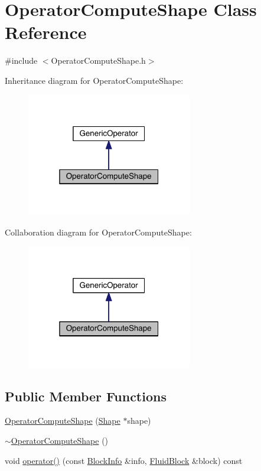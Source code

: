 \hypertarget{class_operator_compute_shape}{}\section{Operator\+Compute\+Shape Class Reference}
\label{class_operator_compute_shape}


{\ttfamily \#include $<$Operator\+Compute\+Shape.\+h$>$}



Inheritance diagram for Operator\+Compute\+Shape\+:\nopagebreak
\begin{figure}[H]
\begin{center}
\leavevmode
\includegraphics[width=205pt]{de/d44/class_operator_compute_shape__inherit__graph}
\end{center}
\end{figure}


Collaboration diagram for Operator\+Compute\+Shape\+:\nopagebreak
\begin{figure}[H]
\begin{center}
\leavevmode
\includegraphics[width=205pt]{d6/d6a/class_operator_compute_shape__coll__graph}
\end{center}
\end{figure}
\subsection*{Public Member Functions}
\begin{DoxyCompactItemize}
\item 
\hyperlink{class_operator_compute_shape_a92dbcb63dd91d79e8cf40b76170a629c}{Operator\+Compute\+Shape} (\hyperlink{class_shape}{Shape} $\ast$shape)
\item 
\hyperlink{class_operator_compute_shape_a2691f394451b34f7e07b6a922af2177d}{$\sim$\+Operator\+Compute\+Shape} ()
\item 
void \hyperlink{class_operator_compute_shape_ad9d3edd854162a93b5c7212bd694e73a}{operator()} (const \hyperlink{struct_block_info}{Block\+Info} \&info, \hyperlink{struct_fluid_block}{Fluid\+Block} \&block) const 
\end{DoxyCompactItemize}


